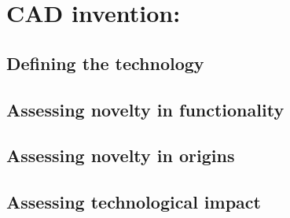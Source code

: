 \section{CAD invention: }
\subsection{Defining the technology}

\subsection{Assessing novelty in functionality}

\subsection{Assessing novelty in origins}

\subsection{Assessing technological impact}